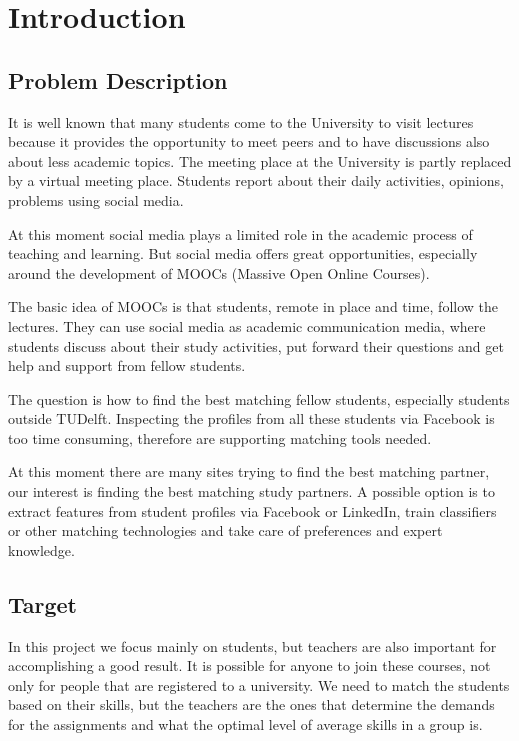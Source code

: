 \chapter{Introduction}

\section{Problem Description}
It is well known that many students come to the University to visit lectures because it provides the opportunity to meet peers and to have discussions also about less academic topics. 
The meeting place at the University is partly replaced by a virtual meeting place. 
Students report about their daily activities, opinions, problems using social media. 

At this moment social media plays a limited role in the academic process of teaching and learning. 
But social media offers great opportunities, especially around the development of MOOCs (Massive Open Online Courses). 

The basic idea of MOOCs is that students, remote in place and time, follow the lectures. 
They can use social media as academic communication media, where students discuss about their study activities, put forward their questions and get help and support from fellow students. 

The question is how to find the best matching fellow students, especially students outside TUDelft. 
Inspecting the profiles from all these students via Facebook is too time consuming, therefore are supporting matching tools needed. 

At this moment there are many sites trying to find the best matching partner, our interest is finding the best matching study partners. 
A possible option is to extract features from student profiles via Facebook or LinkedIn, train classifiers or other matching technologies and take care of preferences and expert knowledge.

\section{Target}
In this project we focus mainly on students, but teachers are also important for accomplishing a good result.
It is possible for anyone to join these courses, not only for people that are registered to a university.
We need to match the students based on their skills, but the teachers are the ones that determine the demands for the assignments and what the optimal level of average skills in a group is.

